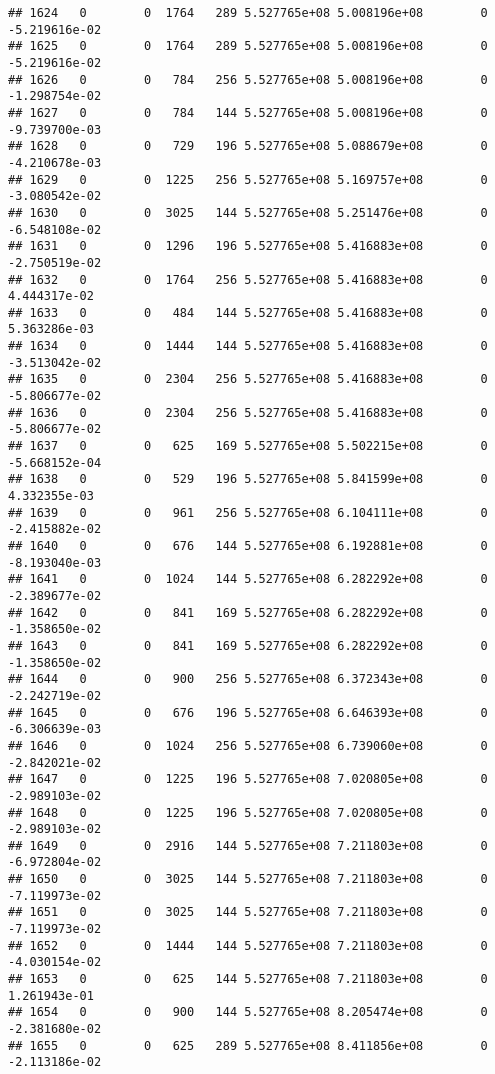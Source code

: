 \documentclass[
]{article}
\begin{document}
\begin{enumerate}
\begin{verbatim}
## 1624   0        0  1764   289 5.527765e+08 5.008196e+08        0 -5.219616e-02
## 1625   0        0  1764   289 5.527765e+08 5.008196e+08        0 -5.219616e-02
## 1626   0        0   784   256 5.527765e+08 5.008196e+08        0 -1.298754e-02
## 1627   0        0   784   144 5.527765e+08 5.008196e+08        0 -9.739700e-03
## 1628   0        0   729   196 5.527765e+08 5.088679e+08        0 -4.210678e-03
## 1629   0        0  1225   256 5.527765e+08 5.169757e+08        0 -3.080542e-02
## 1630   0        0  3025   144 5.527765e+08 5.251476e+08        0 -6.548108e-02
## 1631   0        0  1296   196 5.527765e+08 5.416883e+08        0 -2.750519e-02
## 1632   0        0  1764   256 5.527765e+08 5.416883e+08        0  4.444317e-02
## 1633   0        0   484   144 5.527765e+08 5.416883e+08        0  5.363286e-03
## 1634   0        0  1444   144 5.527765e+08 5.416883e+08        0 -3.513042e-02
## 1635   0        0  2304   256 5.527765e+08 5.416883e+08        0 -5.806677e-02
## 1636   0        0  2304   256 5.527765e+08 5.416883e+08        0 -5.806677e-02
## 1637   0        0   625   169 5.527765e+08 5.502215e+08        0 -5.668152e-04
## 1638   0        0   529   196 5.527765e+08 5.841599e+08        0  4.332355e-03
## 1639   0        0   961   256 5.527765e+08 6.104111e+08        0 -2.415882e-02
## 1640   0        0   676   144 5.527765e+08 6.192881e+08        0 -8.193040e-03
## 1641   0        0  1024   144 5.527765e+08 6.282292e+08        0 -2.389677e-02
## 1642   0        0   841   169 5.527765e+08 6.282292e+08        0 -1.358650e-02
## 1643   0        0   841   169 5.527765e+08 6.282292e+08        0 -1.358650e-02
## 1644   0        0   900   256 5.527765e+08 6.372343e+08        0 -2.242719e-02
## 1645   0        0   676   196 5.527765e+08 6.646393e+08        0 -6.306639e-03
## 1646   0        0  1024   256 5.527765e+08 6.739060e+08        0 -2.842021e-02
## 1647   0        0  1225   196 5.527765e+08 7.020805e+08        0 -2.989103e-02
## 1648   0        0  1225   196 5.527765e+08 7.020805e+08        0 -2.989103e-02
## 1649   0        0  2916   144 5.527765e+08 7.211803e+08        0 -6.972804e-02
## 1650   0        0  3025   144 5.527765e+08 7.211803e+08        0 -7.119973e-02
## 1651   0        0  3025   144 5.527765e+08 7.211803e+08        0 -7.119973e-02
## 1652   0        0  1444   144 5.527765e+08 7.211803e+08        0 -4.030154e-02
## 1653   0        0   625   144 5.527765e+08 7.211803e+08        0  1.261943e-01
## 1654   0        0   900   144 5.527765e+08 8.205474e+08        0 -2.381680e-02
## 1655   0        0   625   289 5.527765e+08 8.411856e+08        0 -2.113186e-02

\end{verbatim}
\end{enumerate}
\end{document}
